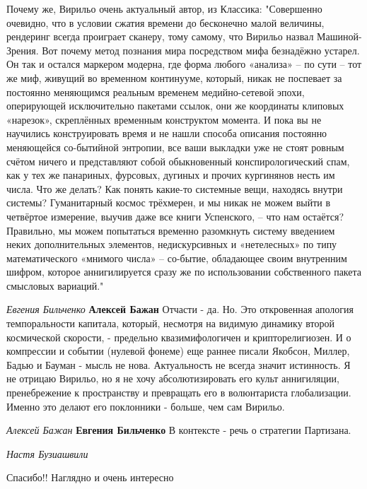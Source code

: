 Почему же, Вирильо очень актуальный автор, из Классика: "Совершенно очевидно,
что в условии сжатия времени до бесконечно малой величины, рендеринг всегда
проиграет сканеру, тому самому, что Вирильо назвал Машиной-Зрения. Вот почему
метод познания мира посредством мифа безнадёжно устарел. Он так и остался
маркером модерна, где форма любого «анализа» – по сути – тот же миф, живущий во
временном континууме, который, никак не поспевает за постоянно меняющимся
реальным временем медийно-сетевой эпохи, оперирующей исключительно пакетами
ссылок, они же координаты клиповых «нарезок», скреплённых временным конструктом
момента. И пока вы не научились конструировать время и не нашли способа
описания постоянно меняющейся со-бытийной энтропии, все ваши выкладки уже не
стоят ровным счётом ничего и представляют собой обыкновенный конспирологический
спам, как у тех же панариных, фурсовых, дугиных и прочих кургинянов несть им
числа.  Что же делать? Как понять какие-то системные вещи, находясь внутри
системы? Гуманитарный космос трёхмерен, и мы никак не можем выйти в четвёртое
измерение, выучив даже все книги Успенского, – что нам остаётся? Правильно, мы
можем попытаться временно разомкнуть систему введением неких дополнительных
элементов, недискурсивных и «нетелесных» по типу математического «мнимого
числа» – со-бытие, обладающее своим внутренним шифром, которое аннигилируется
сразу же по использовании собственного пакета смысловых вариаций."

\emph{Евгения Бильченко}
\textbf{Алексей Бажан} Отчасти - да. Но. Это откровенная апология
темпоральности капитала, который, несмотря на видимую динамику второй
космической скорости, - предельно квазимифологичен и крипторелигиозен. И о
компрессии и событии (нулевой фонеме) еще раннее писали Якобсон, Миллер, Бадью
и Бауман - мысль не нова. Актуальность не всегда значит истинность. Я не
отрицаю Вирильо, но я не хочу абсолютизировать его культ аннигиляции,
пренебрежение к пространству и превращать его в волюнтариста глобализации.
Именно это делают его поклонники - больше, чем сам Вирильо.

\emph{Алексей Бажан}
\textbf{Евгения Бильченко} В контексте - речь о стратегии Партизана.

\emph{Настя Бузиашвили}

Спасибо!! Наглядно и очень интересно

